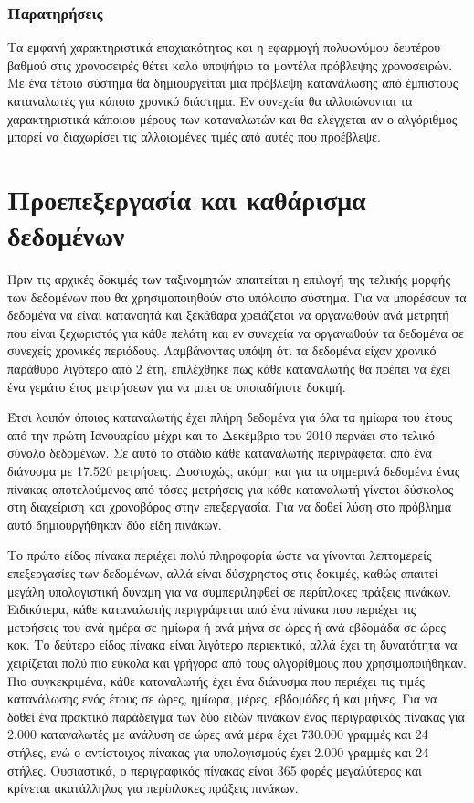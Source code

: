 \subsubsection{Παρατηρήσεις}
Τα εμφανή χαρακτηριστικά εποχιακότητας και η εφαρμογή πολυωνύμου δευτέρου βαθμού στις χρονοσειρές θέτει καλό υποψήφιο τα μοντέλα πρόβλεψης χρονοσειρών. Με ένα τέτοιο σύστημα θα δημιουργείται μια πρόβλεψη κατανάλωσης από έμπιστους καταναλωτές για κάποιο χρονικό διάστημα. Εν συνεχεία θα αλλοιώνονται τα χαρακτηριστικά κάποιου μέρους των καταναλωτών και θα ελέγχεται αν ο αλγόριθμος μπορεί να διαχωρίσει τις αλλοιωμένες τιμές από αυτές που προέβλεψε.

\section{Προεπεξεργασία και καθάρισμα δεδομένων}
Πριν τις αρχικές δοκιμές των ταξινομητών απαιτείται η επιλογή της τελικής μορφής των δεδομένων που θα χρησιμοποιηθούν στο υπόλοιπο σύστημα. Για να μπορέσουν τα δεδομένα να είναι κατανοητά και ξεκάθαρα χρειάζεται να οργανωθούν ανά  μετρητή που είναι ξεχωριστός για κάθε πελάτη και εν συνεχεία να οργανωθούν τα δεδομένα σε συνεχείς χρονικές περιόδους. Λαμβάνοντας υπόψη ότι τα δεδομένα είχαν χρονικό παράθυρο λιγότερο από 2 έτη, επιλέχθηκε πως κάθε καταναλωτής θα πρέπει να έχει ένα γεμάτο έτος μετρήσεων για να μπει σε οποιαδήποτε δοκιμή.\par
Έτσι λοιπόν όποιος καταναλωτής έχει πλήρη δεδομένα για όλα τα ημίωρα του έτους από την πρώτη Ιανουαρίου μέχρι και το Δεκέμβριο του 2010 περνάει στο τελικό σύνολο δεδομένων. Σε αυτό το στάδιο κάθε καταναλωτής περιγράφεται από ένα διάνυσμα με 17.520 μετρήσεις. Δυστυχώς, ακόμη και για τα σημερινά δεδομένα ένας πίνακας αποτελούμενος από τόσες μετρήσεις για κάθε καταναλωτή γίνεται δύσκολος στη διαχείριση και χρονοβόρος στην επεξεργασία. Για να δοθεί λύση στο πρόβλημα αυτό δημιουργήθηκαν δύο είδη πινάκων.\par
Το πρώτο είδος πίνακα περιέχει πολύ πληροφορία ώστε να γίνονται λεπτομερείς επεξεργασίες των δεδομένων, αλλά είναι δύσχρηστος στις δοκιμές, καθώς απαιτεί μεγάλη υπολογιστική δύναμη για να συμπεριληφθεί σε περίπλοκες πράξεις πινάκων. Ειδικότερα, κάθε καταναλωτής περιγράφεται από ένα πίνακα που περιέχει τις μετρήσεις του ανά ημέρα σε ημίωρα ή ανά μήνα σε ώρες ή ανά εβδομάδα σε ώρες κοκ. Το δεύτερο είδος πίνακα είναι λιγότερο περιεκτικό, αλλά έχει τη δυνατότητα να χειρίζεται πολύ πιο εύκολα και γρήγορα από τους αλγορίθμους που χρησιμοποιήθηκαν. Πιο συγκεκριμένα, κάθε καταναλωτής έχει ένα διάνυσμα που περιέχει τις τιμές κατανάλωσης ενός έτους σε ώρες, ημίωρα, μέρες, εβδομάδες ή και μήνες. Για να δοθεί ένα πρακτικό παράδειγμα των δύο ειδών πινάκων ένας περιγραφικός πίνακας για 2.000 καταναλωτές με ανάλυση σε ώρες ανά μέρα έχει 730.000 γραμμές και 24 στήλες, ενώ ο αντίστοιχος πίνακας για υπολογισμούς έχει 2.000 γραμμές και 24 στήλες. Ουσιαστικά, ο περιγραφικός πίνακας είναι 365 φορές μεγαλύτερος και κρίνεται ακατάλληλος για περίπλοκες πράξεις πινάκων.\par
